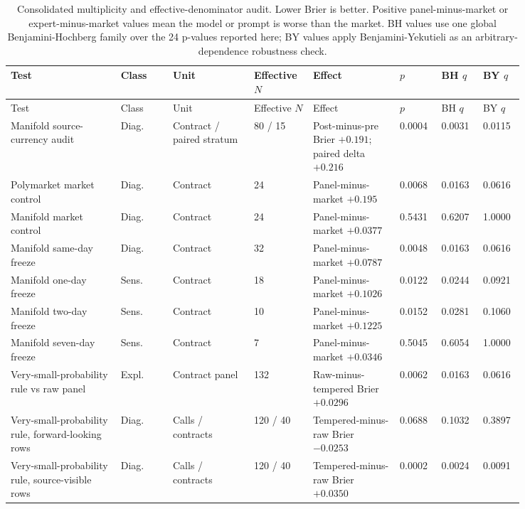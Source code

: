 \documentclass[11pt]{article}
\begin{document}
\begingroup
\scriptsize
\setlength{\tabcolsep}{2pt}
\renewcommand{\arraystretch}{0.9}
\begin{longtable}{@{}L{0.19\linewidth} L{0.09\linewidth} L{0.14\linewidth} L{0.09\linewidth} L{0.15\linewidth} L{0.06\linewidth} L{0.06\linewidth} L{0.06\linewidth}@{}}
\caption{Consolidated multiplicity and effective-denominator audit. Lower Brier is better. Positive panel-minus-market or expert-minus-market values mean the model or prompt is worse than the market. BH values use one global Benjamini-Hochberg family over the 24 p-values reported here; BY values apply Benjamini-Yekutieli as an arbitrary-dependence robustness check.}
\label{tab:multiplicity-audit}\\
\toprule
Test & Class & Unit & Effective \(N\) & Effect & \(p\) & BH \(q\) & BY \(q\) \\
\midrule
\endfirsthead
\toprule
Test & Class & Unit & Effective \(N\) & Effect & \(p\) & BH \(q\) & BY \(q\) \\
\midrule
\endhead
\bottomrule
\endfoot
Manifold source-currency audit & Diag. & Contract / paired stratum & 80 / 15 & Post-minus-pre Brier \(+0.191\); paired delta \(+0.216\) & 0.0004 & 0.0031 & 0.0115 \\
Polymarket market control & Diag. & Contract & 24 & Panel-minus-market \(+0.195\) & 0.0068 & 0.0163 & 0.0616 \\
Manifold market control & Diag. & Contract & 24 & Panel-minus-market \(+0.0377\) & 0.5431 & 0.6207 & 1.0000 \\
Manifold same-day freeze & Diag. & Contract & 32 & Panel-minus-market \(+0.0787\) & 0.0048 & 0.0163 & 0.0616 \\
Manifold one-day freeze & Sens. & Contract & 18 & Panel-minus-market \(+0.1026\) & 0.0122 & 0.0244 & 0.0921 \\
Manifold two-day freeze & Sens. & Contract & 10 & Panel-minus-market \(+0.1225\) & 0.0152 & 0.0281 & 0.1060 \\
Manifold seven-day freeze & Sens. & Contract & 7 & Panel-minus-market \(+0.0346\) & 0.5045 & 0.6054 & 1.0000 \\
Very-small-probability rule vs raw panel & Expl. & Contract panel & 132 & Raw-minus-tempered Brier \(+0.0296\) & 0.0062 & 0.0163 & 0.0616 \\
Very-small-probability rule, forward-looking rows & Diag. & Calls / contracts & 120 / 40 & Tempered-minus-raw Brier \(-0.0253\) & 0.0688 & 0.1032 & 0.3897 \\
Very-small-probability rule, source-visible rows & Diag. & Calls / contracts & 120 / 40 & Tempered-minus-raw Brier \(+0.0350\) & 0.0002 & 0.0024 & 0.0091 \\

\end{longtable}
\end{document}

